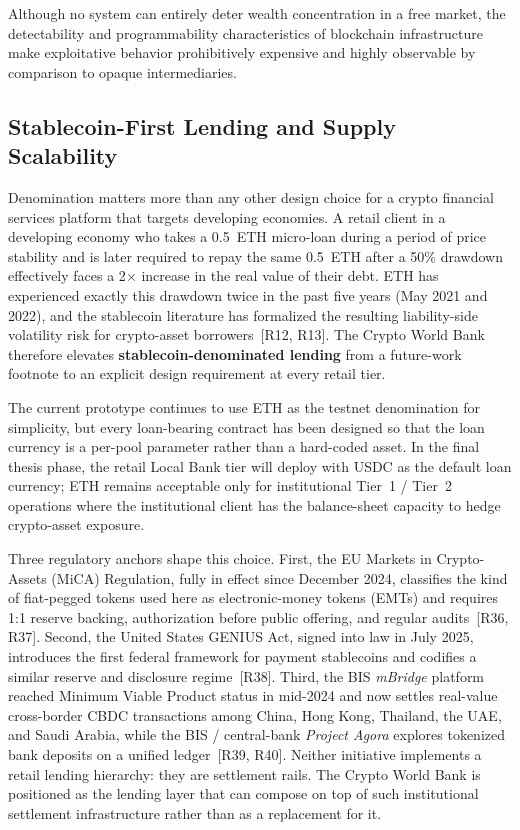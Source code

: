 \documentclass[12pt,a4paper]{report}
\begin{document}
Although no system can entirely deter wealth concentration in a free market, the detectability and programmability characteristics of blockchain infrastructure make exploitative behavior prohibitively expensive and highly observable by comparison to opaque intermediaries.

\subsection{Stablecoin-First Lending and Supply Scalability}
\label{sec:stablecoin-first}

Denomination matters more than any other design choice for a crypto financial services platform that targets developing economies. A retail client in a developing economy who takes a 0.5~ETH micro-loan during a period of price stability and is later required to repay the same 0.5~ETH after a 50\% drawdown effectively faces a 2$\times$ increase in the real value of their debt. ETH has experienced exactly this drawdown twice in the past five years (May 2021 and 2022), and the stablecoin literature has formalized the resulting liability-side volatility risk for crypto-asset borrowers~[R12, R13]. The Crypto World Bank therefore elevates \textbf{stablecoin-denominated lending} from a future-work footnote to an explicit design requirement at every retail tier.

The current prototype continues to use ETH as the testnet denomination for simplicity, but every loan-bearing contract has been designed so that the loan currency is a per-pool parameter rather than a hard-coded asset. In the final thesis phase, the retail Local Bank tier will deploy with USDC as the default loan currency; ETH remains acceptable only for institutional Tier~1 / Tier~2 operations where the institutional client has the balance-sheet capacity to hedge crypto-asset exposure.

Three regulatory anchors shape this choice. First, the EU Markets in Crypto-Assets (MiCA) Regulation, fully in effect since December 2024, classifies the kind of fiat-pegged tokens used here as electronic-money tokens (EMTs) and requires 1{:}1 reserve backing, authorization before public offering, and regular audits~[R36, R37]. Second, the United States GENIUS Act, signed into law in July 2025, introduces the first federal framework for payment stablecoins and codifies a similar reserve and disclosure regime~[R38]. Third, the BIS \textit{mBridge} platform reached Minimum Viable Product status in mid-2024 and now settles real-value cross-border CBDC transactions among China, Hong Kong, Thailand, the UAE, and Saudi Arabia, while the BIS / central-bank \textit{Project Agora} explores tokenized bank deposits on a unified ledger~[R39, R40]. Neither initiative implements a retail lending hierarchy: they are settlement rails. The Crypto World Bank is positioned as the lending layer that can compose on top of such institutional settlement infrastructure rather than as a replacement for it.
\end{document}
